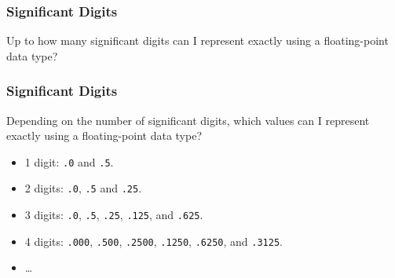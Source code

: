 \begin{frame}

\frametitle{Significant Digits}

\begin{center}

Up to how many significant digits can I represent exactly using a
floating-point data type?

\end{center}

\end{frame}


\begin{frame}[fragile]

\frametitle{Significant Digits}

\begin{center}

Depending on the number of significant digits, which values can I represent
exactly using a floating-point data type?

\end{center}

\begin{itemize}

\item 1 digit: \texttt{.0} and \texttt{.5}.

\pause

\item 2 digits: \texttt{.0}, \texttt{.5} and \texttt{.25}.

\pause

\item 3 digits: \texttt{.0}, \texttt{.5}, \texttt{.25}, \texttt{.125}, and
\texttt{.625}.

\pause

\item 4 digits: \texttt{.000}, \texttt{.500}, \texttt{.2500}, \texttt{.1250},
\texttt{.6250}, and \texttt{.3125}.

\item \ldots

\end{itemize}

\end{frame}
